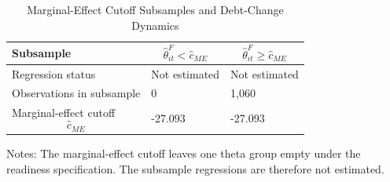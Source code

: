 \begin{table}[H]\centering
\begin{threeparttable}
\caption{Marginal-Effect Cutoff Subsamples and Debt-Change Dynamics}
\label{tab:deltaB_marginal_cutoff_subsample}
\scriptsize
\begin{tabularx}{\textwidth}{lYY}
\toprule
Subsample & $$\widehat{\theta}^{F}_{it}<\widehat{c}_{ME}$$ & $$\widehat{\theta}^{F}_{it}\geq\widehat{c}_{ME}$$ \\
\midrule
Regression status & Not estimated & Not estimated \\
Observations in subsample & 0 & 1,060 \\
Marginal-effect cutoff $$\widehat{c}_{ME}$$ & -27.093 & -27.093 \\
\bottomrule
\end{tabularx}
\begin{tablenotes}[flushleft]\footnotesize
\item Notes: The marginal-effect cutoff leaves one theta group empty under the readiness specification. The subsample regressions are therefore not estimated.
\end{tablenotes}
\end{threeparttable}
\end{table}
